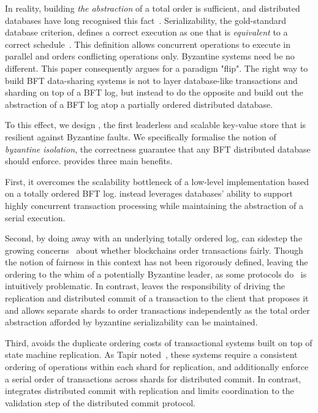 In reality, building \textit{the abstraction} of a total order is sufficient, and distributed databases have long recognised this fact~\cite{crooks2018obladi,bernstein1979fas,Papadimitriou1979serializability,adya99weakconsis}. Serializability, the gold-standard database criterion, defines a correct execution as one that is \textit{equivalent} to a correct schedule~\cite{bernstein1979fas,Papadimitriou1979serializability,bernstein1979fas}. This definition allows concurrent operations to execute in parallel and orders conflicting operations only.  Byzantine systems need be no different. This paper consequently argues for a paradigm "flip". The
right way to build BFT data-sharing systems is not to layer database-like transactions and sharding on top of a BFT log, but instead to do the opposite and build out the abstraction of a BFT log atop a partially ordered distributed database.

To this effect, we design \sys{}, the first leaderless and scalable key-value store that is resilient against
Byzantine faults. We specifically formalise the notion of \textit{byzantine isolation}, the correctness
guarantee that any BFT distributed database should enforce.  \sys{} provides three main benefits.

 First, it overcomes the scalability bottleneck of a low-level
implementation based on a totally ordered BFT log. \sys instead leverages databases' ability to support highly concurrent transaction
processing while maintaining the abstraction
of a serial execution.


Second, by doing away with an underlying totally ordered log, \sys{} can
sidestep the growing concerns~\cite{} about whether blockchains
order transactions fairly. Though the notion of fairness in this
context has not been rigorously defined, leaving the ordering to the
whim of a potentially Byzantine leader, as some protocols do~\cite{
Kotla07Zyzzyva,castro1999practical}
is intuitively problematic. In contrast, \sys leaves the
responsibility of driving the replication and distributed commit of a
transaction to the client that proposes it and allows separate 
shards to order transactions independently as the total order abstraction afforded by byzantine serializability can be maintained.

Third, \sys{} avoids the duplicate ordering costs of transactional systems
built on top of state machine replication. As Tapir noted~\cite{zhang2015tapir,mu2016consolidating},
these systems require a consistent ordering of
operations within each shard for replication, and additionally enforce a serial order of transactions across
shards for distributed commit. In contrast, \sys{} integrates distributed commit with 
replication and
limits coordination to the validation step of the distributed commit
protocol.

